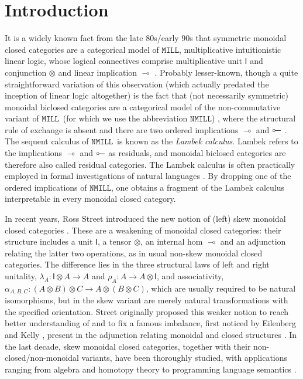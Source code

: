\documentclass[copyright,creativecommons]{eptcs}
\theoremstyle{definition}
\newcommand{\ot}{\otimes}
\newcommand{\lolli}{\multimap}
\newcommand{\illol}{\rotatebox[origin=c]{180}{$\multimap$}}
\newcommand{\I}{\mathsf{I}}
\newcommand{\MILL}{$\mathtt{MILL}$}
\newcommand{\NMILL}{$\mathtt{NMILL}$}
\begin{document}
\section{Introduction}
It is a widely known fact from the late 80s/early 90s that symmetric monoidal closed categories are a categorical model of \MILL, multiplicative intuitionistic linear logic, whose logical connectives comprise multiplicative unit $\I$ and conjunction $\ot$ and linear implication $\lolli$ \cite{mellies:categorical:09}. Probably lesser-known, though a quite straightforward variation of this observation (which actually predated the inception of linear logic altogether) is the fact that (not necessarily symmetric) monoidal biclosed categories are a categorical model of the non-commutative variant of \MILL\ (for which we use the abbreviation \NMILL) \cite{abrusci:noncommutative:1990}, where the structural rule of exchange is absent and there are two ordered implications $\lolli$ and $\illol$ \cite{lambek:deductive:68}. The sequent calculus of \NMILL\ is known as the \emph{Lambek calculus}. Lambek refers to the implications $\lolli$ and $\illol$ as residuals, and monoidal biclosed categories are therefore also called residual categories. The Lambek calculus is often practically employed in formal investigations of natural languages \cite{lambek:mathematics:58}.
By dropping one of the ordered implications of \NMILL, one obtains a fragment of the Lambek calculus interpretable in every monoidal closed category.

In recent years, Ross Street introduced the new notion of (left) skew monoidal closed categories \cite{street:skew-closed:2013}. These are a weakening of monoidal closed categories: their structure includes a unit $\I$, a tensor $\ot$, an internal hom $\lolli$ and an adjunction relating the latter two operations, as in usual non-skew monoidal closed categories. The difference lies in the three structural laws of left and right unitality, $\lambda_A : \I \ot A \to A$ and $\rho_A : A \to A \ot \I$, and associativity, $\alpha_{A,B,C} : (A \ot B) \ot C \to A \ot (B \ot C)$, which are usually required to be natural isomorphisms, but in the skew variant are merely natural transformations with the specified orientation. Street originally proposed this weaker notion to reach better understanding of and to fix a famous imbalance, first noticed by Eilenberg and Kelly \cite{eilenberg:closed:1966}, present in the adjunction relating monoidal and closed structures \cite{street:skew-closed:2013,uustalu:eilenberg-kelly:2020}. In the last decade, skew monoidal closed categories, together with their non-closed/non-monoidal variants, have been thoroughly studied, with applications ranging from algebra and homotopy theory to programming language semantics \cite{szlachanyi:skew-monoidal:2012,lack:skew:2012,lack:triangulations:2014,altenkirch:monads:2014,buckley:catalan:2015,bourke:skew:2017,bourke:skew:2018,tomita:realizability:21}.
\end{document}
